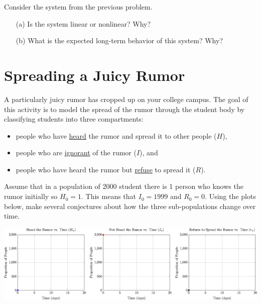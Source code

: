 

\begin{problem}
    Consider the system from the previous problem.
    \begin{enumerate}
        \item[(a)] Is the system linear or nonlinear?  Why?
        \item[(b)] What is the expected long-term behavior of this system?  Why?
    \end{enumerate}
\end{problem}


\section{Spreading a Juicy Rumor}
A particularly juicy rumor has cropped up on your college campus.  The goal of this
activity is to model the spread of the rumor through the student body by classifying
students into three compartments: 
\begin{itemize}
    \item people who have \underline{heard} the rumor and spread it to other people ($H$),
    \item people who are \underline{ignorant} of the rumor ($I$), and
    \item people who have heard the rumor but \underline{refuse} to spread it ($R$).
\end{itemize}


\begin{problem}
    Assume that in a population of 2000 student there is 1 person who knows the
    rumor initially so $H_0 = 1$.  This
    means that $I_0 = 1999$ and $R_0=0$.  Using the plots below, make several conjectures
    about how the three sub-populations change over time.
    \begin{center}
        \includegraphics[width=1.0\columnwidth]{BlankAxes.eps}
    \end{center}
\end{problem}


